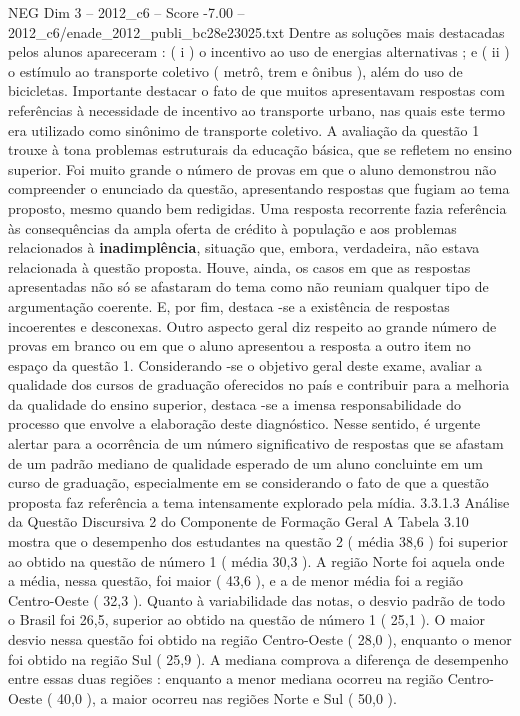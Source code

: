\begin{textsample}{NEG Dim 3 – 2012\_c6 – Score -7.00 – 2012\_c6/enade\_2012\_publi\_bc28e23025.txt}
Dentre as soluções mais destacadas pelos alunos apareceram : ( i ) o incentivo ao uso de energias alternativas ; e ( ii ) o estímulo ao transporte coletivo ( metrô, trem e ônibus ), além do uso de bicicletas.
Importante destacar o fato de que muitos apresentavam respostas com referências à necessidade de incentivo ao transporte urbano, nas quais este termo era utilizado como sinônimo de transporte coletivo.
A avaliação da questão 1 trouxe à tona problemas estruturais da educação básica, que se refletem no ensino superior.
Foi muito grande o número de provas em que o aluno demonstrou não compreender o enunciado da questão, apresentando respostas que fugiam ao tema proposto, mesmo quando bem redigidas.
Uma resposta recorrente fazia referência às consequências da ampla oferta de crédito à população e aos problemas relacionados à \textbf{inadimplência}, situação que, embora, verdadeira, não estava relacionada à questão proposta.
Houve, ainda, os casos em que as respostas apresentadas não só se afastaram do tema como não reuniam qualquer tipo de argumentação coerente.
E, por fim, destaca -se a existência de respostas incoerentes e desconexas.
Outro aspecto geral diz respeito ao grande número de provas em branco ou em que o aluno apresentou a resposta a outro item no espaço da questão 1.
Considerando -se o objetivo geral deste exame, avaliar a qualidade dos cursos de graduação oferecidos no país e contribuir para a melhoria da qualidade do ensino superior, destaca -se a imensa responsabilidade do processo que envolve a elaboração deste diagnóstico.
Nesse sentido, é urgente alertar para a ocorrência de um número significativo de respostas que se afastam de um padrão mediano de qualidade esperado de um aluno concluinte em um curso de graduação, especialmente em se considerando o fato de que a questão proposta faz referência a tema intensamente explorado pela mídia. 3.3.1.3 Análise da Questão Discursiva 2 do Componente de Formação Geral A Tabela 3.10 mostra que o desempenho dos estudantes na questão 2 ( média 38,6 ) foi superior ao obtido na questão de número 1 ( média 30,3 ).
A região Norte foi aquela onde a média, nessa questão, foi maior ( 43,6 ), e a de menor média foi a região Centro-Oeste ( 32,3 ).
Quanto à variabilidade das notas, o desvio padrão de todo o Brasil foi 26,5, superior ao obtido na questão de número 1 ( 25,1 ).
O maior desvio nessa questão foi obtido na região Centro-Oeste ( 28,0 ), enquanto o menor foi obtido na região Sul ( 25,9 ).
A mediana comprova a diferença de desempenho entre essas duas regiões : enquanto a menor mediana ocorreu na região Centro-Oeste ( 40,0 ), a maior ocorreu nas regiões Norte e Sul ( 50,0 ).

\end{textsample}
